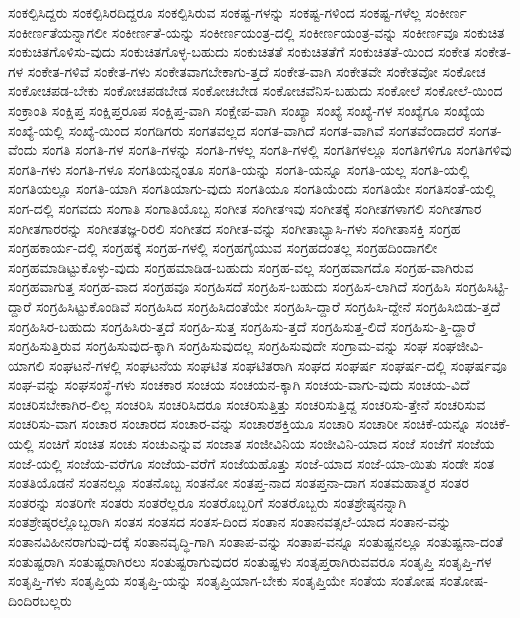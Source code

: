{ಸಂಕಲ್ಪಿಸಿದ್ದರು
ಸಂಕಲ್ಪಿಸಿರದಿದ್ದರೂ
ಸಂಕಲ್ಪಿಸಿರುವ
ಸಂಕಷ್ಟ-ಗಳನ್ನು
ಸಂಕಷ್ಟ-ಗಳಿಂದ
ಸಂಕಷ್ಟ-ಗಳೆಲ್ಲ
ಸಂಕೀರ್ಣ
ಸಂಕೀರ್ಣತೆಯನ್ನಾಗಲೀ
ಸಂಕೀರ್ಣತೆ-ಯನ್ನು
ಸಂಕೀರ್ಣಯಂತ್ರ-ದಲ್ಲಿ
ಸಂಕೀರ್ಣಯಂತ್ರ-ವನ್ನು
ಸಂಕೀರ್ಣವೂ
ಸಂಕುಚಿತ
ಸಂಕುಚಿತಗೊಳಿಸು-ವುದು
ಸಂಕುಚಿತಗೊಳ್ಳ-ಬಹುದು
ಸಂಕುಚಿತತೆ
ಸಂಕುಚಿತತೆಗೆ
ಸಂಕುಚಿತತೆ-ಯಿಂದ
ಸಂಕೇತ
ಸಂಕೇತ-ಗಳ
ಸಂಕೇತ-ಗಳಿವೆ
ಸಂಕೇತ-ಗಳು
ಸಂಕೇತವಾಗಬೇಕಾಗು-ತ್ತದೆ
ಸಂಕೇತ-ವಾಗಿ
ಸಂಕೇತವೇ
ಸಂಕೇತವೋ
ಸಂಕೋಚ
ಸಂಕೋಚಪಡ-ಬೇಕು
ಸಂಕೋಚಪಡಬೇಡ
ಸಂಕೋಚಬೇಡ
ಸಂಕೋಚವೆನಿಸ-ಬಹುದು
ಸಂಕೋಲೆ
ಸಂಕೋಲೆ-ಯಿಂದ
ಸಂಕ್ರಾಂತಿ
ಸಂಕ್ಷಿಪ್ತ
ಸಂಕ್ಷಿಪ್ತರೂಪ
ಸಂಕ್ಷಿಪ್ತ-ವಾಗಿ
ಸಂಕ್ಷೇಪ-ವಾಗಿ
ಸಂಖ್ಯಾ
ಸಂಖ್ಯೆ
ಸಂಖ್ಯೆ-ಗಳ
ಸಂಖ್ಯೆಗೂ
ಸಂಖ್ಯೆಯ
ಸಂಖ್ಯೆ-ಯಲ್ಲಿ
ಸಂಖ್ಯೆ-ಯಿಂದ
ಸಂಗಡಿಗರು
ಸಂಗತವಲ್ಲದ
ಸಂಗತ-ವಾಗಿದೆ
ಸಂಗತ-ವಾಗಿವೆ
ಸಂಗತವೆಂದಾದರೆ
ಸಂಗತ-ವೆಂದು
ಸಂಗತಿ
ಸಂಗತಿ-ಗಳ
ಸಂಗತಿ-ಗಳನ್ನು
ಸಂಗತಿ-ಗಳಲ್ಲ
ಸಂಗತಿ-ಗಳಲ್ಲಿ
ಸಂಗತಿಗಳಲ್ಲೂ
ಸಂಗತಿಗಳಿಗೂ
ಸಂಗತಿಗಳಿವು
ಸಂಗತಿ-ಗಳು
ಸಂಗತಿ-ಗಳೂ
ಸಂಗತಿಯನ್ನಂತೂ
ಸಂಗತಿ-ಯನ್ನು
ಸಂಗತಿ-ಯನ್ನೂ
ಸಂಗತಿ-ಯಲ್ಲ
ಸಂಗತಿ-ಯಲ್ಲಿ
ಸಂಗತಿಯಲ್ಲೂ
ಸಂಗತಿ-ಯಾಗಿ
ಸಂಗತಿಯಾಗು-ವುದು
ಸಂಗತಿಯೂ
ಸಂಗತಿಯೆಂದು
ಸಂಗತಿಯೇ
ಸಂಗತಿಸಂತೆ-ಯಲ್ಲಿ
ಸಂಗ-ದಲ್ಲಿ
ಸಂಗವದು
ಸಂಗಾತಿ
ಸಂಗಾತಿಯೊಬ್ಬ
ಸಂಗೀತ
ಸಂಗೀತಇವು
ಸಂಗೀತಕ್ಕೆ
ಸಂಗೀತಗಳಾಗಲಿ
ಸಂಗೀತಗಾರ
ಸಂಗೀತಗಾರರನ್ನು
ಸಂಗೀತತಜ್ಞ-ರಿರಲಿ
ಸಂಗೀತದ
ಸಂಗೀತ-ವನ್ನು
ಸಂಗೀತಾಭ್ಯಾಸಿ-ಗಳು
ಸಂಗೀತಾಸಕ್ತಿ
ಸಂಗ್ರಹ
ಸಂಗ್ರಹಕಾರ್ಯ-ದಲ್ಲಿ
ಸಂಗ್ರಹಕ್ಕೆ
ಸಂಗ್ರಹ-ಗಳಲ್ಲಿ
ಸಂಗ್ರಹಗೈಯುವ
ಸಂಗ್ರಹದಂತಲ್ಲ
ಸಂಗ್ರಹದಿಂದಾಗಲೀ
ಸಂಗ್ರಹಮಾಡಿಟ್ಟುಕೊಳ್ಳು-ವುದು
ಸಂಗ್ರಹಮಾಡಿಡ-ಬಹುದು
ಸಂಗ್ರಹ-ವಲ್ಲ
ಸಂಗ್ರಹವಾಗದೊ
ಸಂಗ್ರಹ-ವಾಗಿರುವ
ಸಂಗ್ರಹವಾಗುತ್ತ
ಸಂಗ್ರಹ-ವಾದ
ಸಂಗ್ರಹವೂ
ಸಂಗ್ರಹಿಸದೆ
ಸಂಗ್ರಹಿಸ-ಬಹುದು
ಸಂಗ್ರಹಿಸ-ಲಾಗಿದೆ
ಸಂಗ್ರಹಿಸಿ
ಸಂಗ್ರಹಿಸಿಟ್ಟಿ-ದ್ದಾರೆ
ಸಂಗ್ರಹಿಸಿಟ್ಟುಕೊಂಡಿವೆ
ಸಂಗ್ರಹಿಸಿದ
ಸಂಗ್ರಹಿಸಿದಂತೆಯೇ
ಸಂಗ್ರಹಿಸಿ-ದ್ದಾರೆ
ಸಂಗ್ರಹಿಸಿ-ದ್ದೇನೆ
ಸಂಗ್ರಹಿಸಿಬಿಡು-ತ್ತದೆ
ಸಂಗ್ರಹಿಸಿರ-ಬಹುದು
ಸಂಗ್ರಹಿಸಿರು-ತ್ತದೆ
ಸಂಗ್ರಹಿ-ಸುತ್ತ
ಸಂಗ್ರಹಿಸು-ತ್ತದೆ
ಸಂಗ್ರಹಿಸುತ್ತ-ಲಿದೆ
ಸಂಗ್ರಹಿಸು-ತ್ತಿ-ದ್ದಾರೆ
ಸಂಗ್ರಹಿಸುತ್ತಿರುವ
ಸಂಗ್ರಹಿಸುವುದ-ಕ್ಕಾಗಿ
ಸಂಗ್ರಹಿಸುವುದಲ್ಲ
ಸಂಗ್ರಹಿಸುವುದೇ
ಸಂಗ್ರಾಮ-ವನ್ನು
ಸಂಘ
ಸಂಘಜೀವಿ-ಯಾಗಲಿ
ಸಂಘಟನೆ-ಗಳಲ್ಲಿ
ಸಂಘಟನೆಯ
ಸಂಘಟಿತ
ಸಂಘಟಿತರಾಗಿ
ಸಂಘದ
ಸಂಘರ್ಷ
ಸಂಘರ್ಷ-ದಲ್ಲಿ
ಸಂಘರ್ಷವೂ
ಸಂಘ-ವನ್ನು
ಸಂಘಸಂಸ್ಥೆ-ಗಳು
ಸಂಚಕಾರ
ಸಂಚಯ
ಸಂಚಯನ-ಕ್ಕಾಗಿ
ಸಂಚಯ-ವಾಗು-ವುದು
ಸಂಚಯ-ವಿದೆ
ಸಂಚರಿಸಬೇಕಾಗಿರ-ಲಿಲ್ಲ
ಸಂಚರಿಸಿ
ಸಂಚರಿಸಿದರೂ
ಸಂಚರಿಸುತ್ತಿತ್ತು
ಸಂಚರಿಸುತ್ತಿದ್ದ
ಸಂಚರಿಸು-ತ್ತೇನೆ
ಸಂಚರಿಸುವ
ಸಂಚರಿಸು-ವಾಗ
ಸಂಚಾರ
ಸಂಚಾರದ
ಸಂಚಾರ-ವನ್ನು
ಸಂಚಾರಶಕ್ತಿಯೂ
ಸಂಚಾರಿ
ಸಂಚಾರೀ
ಸಂಚಿಕೆ-ಯನ್ನೂ
ಸಂಚಿಕೆ-ಯಲ್ಲಿ
ಸಂಚಿಗೆ
ಸಂಚಿತ
ಸಂಚು
ಸಂಚುಎನ್ನುವ
ಸಂಜಾತ
ಸಂಜೀವಿನಿಯ
ಸಂಜೀವಿನಿ-ಯಾದ
ಸಂಜೆ
ಸಂಜೆಗೆ
ಸಂಜೆಯ
ಸಂಜೆ-ಯಲ್ಲಿ
ಸಂಜೆಯ-ವರೆಗೂ
ಸಂಜೆಯ-ವರೆಗೆ
ಸಂಜೆಯಹೊತ್ತು
ಸಂಜೆ-ಯಾದ
ಸಂಜೆ-ಯಾ-ಯಿತು
ಸಂಡೇ
ಸಂತ
ಸಂತತಿಯೊಡನೆ
ಸಂತನಲ್ಲೂ
ಸಂತನೊಬ್ಬ
ಸಂತನೋ
ಸಂತಪ್ತ-ನಾದ
ಸಂತಪ್ತನಾ-ದಾಗ
ಸಂತಮಹಾತ್ಮರ
ಸಂತರ
ಸಂತರನ್ನು
ಸಂತರಿಗೇ
ಸಂತರು
ಸಂತರೆಲ್ಲರೂ
ಸಂತರೊಬ್ಬರಿಗೆ
ಸಂತರೊಬ್ಬರು
ಸಂತಶ್ರೇಷ್ಠನನ್ನಾಗಿ
ಸಂತಶ್ರೇಷ್ಠರಲ್ಲೊಬ್ಬರಾಗಿ
ಸಂತಸ
ಸಂತಸದ
ಸಂತಸ-ದಿಂದ
ಸಂತಾನ
ಸಂತಾನವತ್ಸಲೆ-ಯಾದ
ಸಂತಾನ-ವನ್ನು
ಸಂತಾನವಿಹೀನರಾಗುವು-ದಕ್ಕೆ
ಸಂತಾನವೃದ್ಧಿ-ಗಾಗಿ
ಸಂತಾಪ-ವನ್ನು
ಸಂತಾಪ-ವನ್ನೂ
ಸಂತುಷ್ಟನಲ್ಲೂ
ಸಂತುಷ್ಟನಾ-ದಂತೆ
ಸಂತುಷ್ಟರಾಗಿ
ಸಂತುಷ್ಟರಾಗಿರಲು
ಸಂತುಷ್ಟರಾಗುವುದರ
ಸಂತುಷ್ಟಳು
ಸಂತೃಪ್ತರಾಗಿರುವವರೂ
ಸಂತೃಪ್ತಿ
ಸಂತೃಪ್ತಿ-ಗಳ
ಸಂತೃಪ್ತಿ-ಗಳು
ಸಂತೃಪ್ತಿಯ
ಸಂತೃಪ್ತಿ-ಯನ್ನು
ಸಂತೃಪ್ತಿಯಾಗ-ಬೇಕು
ಸಂತೃಪ್ತಿಯೇ
ಸಂತೆಯ
ಸಂತೋಷ
ಸಂತೋಷ-ದಿಂದಿರಬಲ್ಲರು
}
